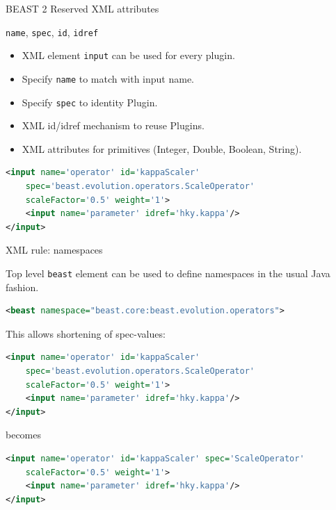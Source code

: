 \documentclass{beamer}
\theoremstyle{definition}
\begin{document}
\begin{frame}[containsverbatim]{BEAST 2 Reserved XML attributes}

{\tt name}, {\tt spec}, {\tt id}, {\tt idref}
\begin{itemize}
\item XML element {\tt input} can be used for every plugin.
\item Specify {\tt name} to match with input name.
\item Specify {\tt spec} to identity Plugin.
\item XML id/idref mechanism to reuse Plugins.
\item XML attributes for primitives (Integer, Double, Boolean, String).
\end{itemize}

{\small
\begin{lstlisting}[language=XML]
<input name='operator' id='kappaScaler' 
    spec='beast.evolution.operators.ScaleOperator' 
    scaleFactor='0.5' weight='1'>
    <input name='parameter' idref='hky.kappa'/>
</input>
\end{lstlisting}
}
\end{frame}

\begin{frame}[containsverbatim]{XML rule: namespaces}


Top level {\tt beast} element can be used to define namespaces
in the usual Java fashion.

\begin{lstlisting}[language=XML]
    <beast namespace="beast.core:beast.evolution.operators">
\end{lstlisting}

This allows shortening of spec-values:

{\small
\begin{lstlisting}[language=XML]
<input name='operator' id='kappaScaler' 
    spec='beast.evolution.operators.ScaleOperator' 
    scaleFactor='0.5' weight='1'>
    <input name='parameter' idref='hky.kappa'/>
</input>
\end{lstlisting}
}

becomes

{\small
\begin{lstlisting}[language=XML]
<input name='operator' id='kappaScaler' spec='ScaleOperator' 
    scaleFactor='0.5' weight='1'>
    <input name='parameter' idref='hky.kappa'/>
</input>
\end{lstlisting}
}
\end{frame}
\end{document}
